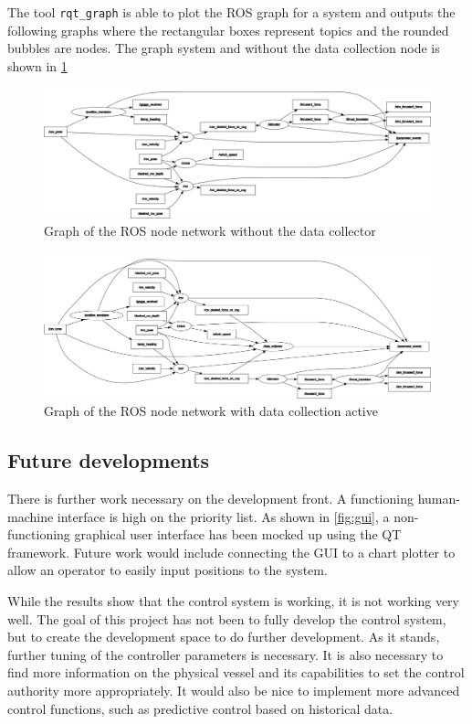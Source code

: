 \documentclass[class=article, crop=false]{standalone}
\begin{document}
The tool \texttt{rqt\_graph} is able to plot the ROS graph for a system and outputs the following graphs where the rectangular boxes represent topics and the rounded bubbles are nodes. The graph system and without the data collection node is shown in \cref{fig:ros_graph}
\begin{figure}
    \centering
    \includegraphics[width=\textheight]{rosgraph-nodata}
    \caption{Graph of the ROS node network without the data collector}
    \label{fig:ros_graph}
\end{figure}

\begin{figure}
    \centering
    \includegraphics[width=\textheight]{rosgraph-data}
    \caption{Graph of the ROS node network with data collection active}
\end{figure}

\subsection{Future developments}
There is further work necessary on the development front. A functioning human-machine interface is high on the priority list. As shown in \cref{fig:gui}, a non-functioning graphical user interface has been mocked up using the QT framework. Future work would include connecting the GUI to a chart plotter to allow an operator to easily input positions to the system.

While the results show that the control system is working, it is not working very well. The goal of this project has not been to fully develop the control system, but to create the development space to do further development. As it stands, further tuning of the controller parameters is necessary. It is also necessary to find more information on the physical vessel and its capabilities to set the control authority more appropriately. It would also be nice to implement more advanced control functions, such as predictive control based on historical data.
\end{document}

